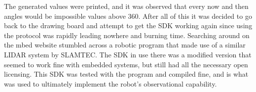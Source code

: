 		The generated values were printed, and it was observed that every now and then angles would be impossible values above 360. After all of this it was decided to go back to the drawing board and attempt to get the SDK working again since using the protocol was rapidly leading nowhere and burning time. Searching around on the mbed website stumbled across a robotic program that made use of a similar LIDAR system by SLAMTEC. The SDK in use there was a modified version that seemed to work fine with embedded systems, but still had all the necessary open licensing. This SDK was tested with the program and compiled fine, and is what was used to ultimately implement the robot's observational capability.
		
		
		